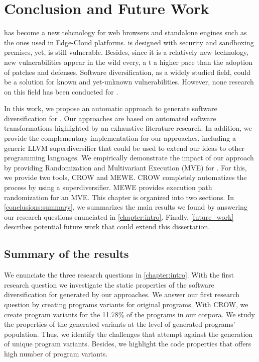 \chapter{Conclusion and Future Work}
\label{chapter:conclude}

\wasm has become a new tehcnology for web browsers and standalone engines such as the ones used in Edge-Cloud platforms. \wasm is designed with security and sandboxing premises, yet, is still vulnerable.
Besides, since it is a relatively new technology, new vulnerabilities appear in the wild every, a t a higher pace than the adoption of patches and defenses.
Software diversification, as a widely studied field, could be a solution for known and yet-unknown vulnerabilities. However, none research on this field has been conducted for \wasm.

In this work, we propose an automatic approach to generate software diversification for \wasm. 
Our approaches are based on automated software transformations highlighted by an exhaustive literature research.
In addition, we provide the complementary implementation for our approaches, including a generic LLVM superdiversifier that could be used to extend our ideas to other programming languages.
We empirically demonstrate the impact of our approach by providing Randomization and Multivariant Execution (MVE) for \wasm.
For this, we provide two tools, CROW and MEWE. CROW completely automatizes the process by using a superdiversifier. MEWE provides execution path randomization for an MVE.
This chapter is organized into two sections. 
In \autoref{conclusions:summary}, we summarizes the main results we found by answering our research questions enunciated in \autoref{chapter:intro}.
Finally, \autoref{future_work} describes potential future work that could extend this dissertation.

\section{Summary of the results}
\label{conclusions:summary}
We enunciate the three research questions in \autoref{chapter:intro}. 
With the first research question we investigate the static properties of the software diversification for \wasm generated by our approaches. 
We answer our first research question by creating programs variants for  original programs. 
With CROW, we create program variants for the 11.78\% of the programs in our corpora.
We study the properties of the generated variants at the level of generated programs' population.
Thus, we identify the challenges that attempt against the generation of unique program variants.
Besides, we highlight the code properties that offers high number of program variants. 

